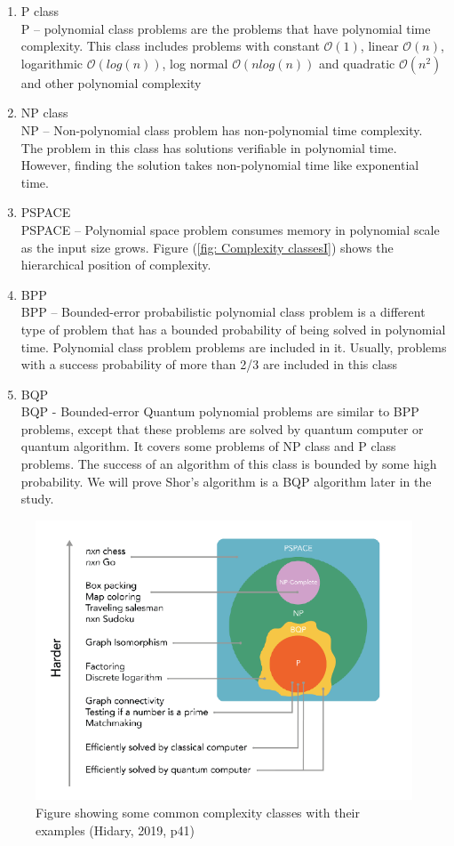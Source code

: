 \begin{enumerate}
    \item P class
    \\ P – polynomial class problems are the problems that have polynomial time complexity. This class includes problems with constant $\mathcal{O}(1)$, linear $\mathcal{O}(n)$, logarithmic $\mathcal{O}(log(n))$, log normal $\mathcal{O}(nlog(n))$ and quadratic $\mathcal{O}(n^2)$ and other polynomial complexity
     
    \item NP class
    \\ NP – Non-polynomial class problem has non-polynomial time complexity. The problem in this class has solutions verifiable in polynomial time. However, finding the solution takes non-polynomial time like exponential time.
     
    \item PSPACE
    \\ PSPACE – Polynomial space problem consumes memory in polynomial scale as the input size grows. Figure (\ref{fig: Complexity classesI}) shows the hierarchical position of complexity.
     
    \item BPP
    \\ BPP – Bounded-error probabilistic polynomial class problem is a different type of problem that has a bounded probability of being solved in polynomial time. Polynomial class problem problems are included in it. Usually, problems with a success probability of more than 2/3 are included in this class
     
    \item \acrshort{BQP}
    \\ \acrshort{BQP} - Bounded-error Quantum polynomial problems are similar to BPP problems, except that these problems are solved by quantum computer or quantum algorithm. It covers some problems of NP class and P class problems. The success of an algorithm of this class is bounded by some high probability. We will prove Shor’s algorithm is a \acrshort{BQP} algorithm later in the study.
\end{enumerate}
\begin{figure}[H]
    \centering
    \includegraphics[scale=0.6]{figures/complexity-classes-example.PNG}
    \caption{Figure showing some common complexity classes with their examples \protect \cite{Hidary}(Hidary, 2019, p41)}
    \label{fig: Complexity classesII}
\end{figure}
 